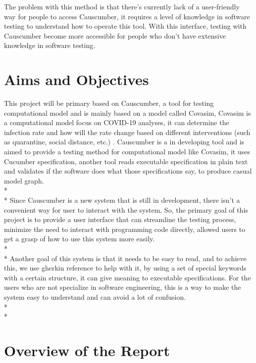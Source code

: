 The problem with this method is that there’s currently lack of a user-friendly way for people to access Causcumber, it requires a level of knowledge in software testing to understand how to operate this tool. With this interface, testing with Causcumber become more accessible for people who don’t have extensive knowledge in software testing.

\section{Aims and Objectives}

This project will be primary based on Causcumber, a tool for testing computational model and is mainly based on a model called Covasim, Covasim is a computational model focus on COVID-19 analyses, it can determine the infection rate and how will the rate change based on different interventions (such as quarantine, social distance, etc.) \cite{Reference3}. Causcumber is a in developing tool and is aimed to provide a testing method for computational model like Covasim, it uses Cucumber specification, another tool reads executable specification in plain text and validates if the software does what those specifications say, to produce casual model graph. \\*\\*
Since Causcumber is a new system that is still in development, there isn’t a convenient way for user to interact with the system. So, the primary goal of this project is to provide a user interface that can streamline the testing process, minimize the need to interact with programming code directly, allowed users to get a grasp of how to use this system more easily. \\*\\*
Another goal of this system is that it needs to be easy to read, and to achieve this, we use gherkin reference to help with it, by using a set of special keywords with a certain structure, it can give meaning to executable specifications. For the users who are not specialize in software engineering, this is a way to make the system easy to understand and can avoid a lot of confusion. \\*\\*



\section{Overview of the Report}

